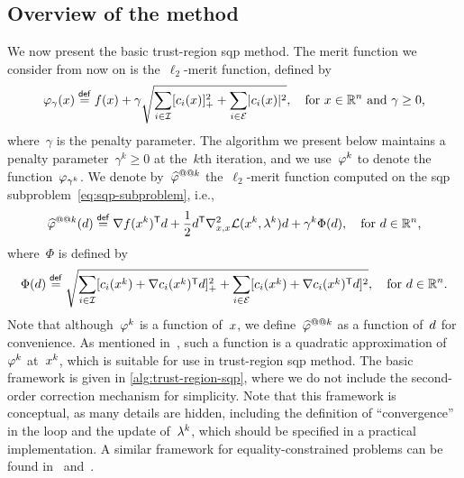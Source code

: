 \subsection{Overview of the method}

We now present the basic trust-region \gls{sqp} method.
The merit function we consider from now on is the~$\ell_2$-merit function, defined by
\begin{equation*}
    \merit_{\gamma}(\iter) \eqdef \obj(\iter) + \gamma \sqrt{\sum_{i \in \iub} \posp{\con{i}(\iter)}^2 + \sum_{i \in \ieq} \abs{\con{i}(\iter)}^2}, \quad \text{for~$\iter \in \R^n$ and~$\gamma \ge 0$,}
\end{equation*}
where~$\gamma$ is the penalty parameter.
The algorithm we present below maintains a penalty parameter~$\gamma^k \ge 0$ at the~$k$th iteration, and we use~$\merit[k]$ to denote the function~$\merit_{\gamma^k}$.
We denote by~$\meritm[k]$ the~$\ell_2$-merit function computed on the \gls{sqp} subproblem~\cref{eq:sqp-subproblem}, i.e.,
\begin{equation*}
    \meritm[k](\step) \eqdef \nabla \obj(\iter[k])^{\T} \step + \frac{1}{2} \step^{\T} \nabla_{x, x}^2 \lag(\iter[k], \lm[k]) \step + \gamma^k \Phi(\step), \quad \text{for~$\step \in \R^n$,}
\end{equation*}
where~$\Phi$ is defined by
\begin{equation*}
    \Phi(\step) \eqdef \sqrt{\sum_{i \in \iub} \posp{\con{i}(\iter[k]) + \nabla \con{i}(\iter[k])^{\T} \step}^2 + \sum_{i \in \ieq} [\con{i}(\iter[k]) + \nabla \con{i}(\iter[k])^{\T} \step]^2}, \quad \text{for~$\step \in \R^n$.}
\end{equation*}
Note that although~$\merit[k]$ is a function of~$\iter$, we define~$\meritm[k]$ as a function of~$\step$ for convenience.
As mentioned in~\cite[\S~15.3.2.1]{Conn_Gould_Toint_2000}, such a function is a quadratic approximation of~$\merit[k]$ at~$\iter[k]$, which is suitable for use in trust-region \gls{sqp} method.
The basic framework is given in \cref{alg:trust-region-sqp}, where we do not include the second-order correction mechanism for simplicity.
Note that this framework is conceptual, as many details are hidden, including the definition of \enquote{convergence} in the loop and the update of~$\lm[k]$, which should be specified in a practical implementation.
A similar framework for equality-constrained problems can be found in~\cite[\S~2]{Powell_Yuan_1991} and~\cite[Alg.~18.4]{Nocedal_Wright_2006}.


